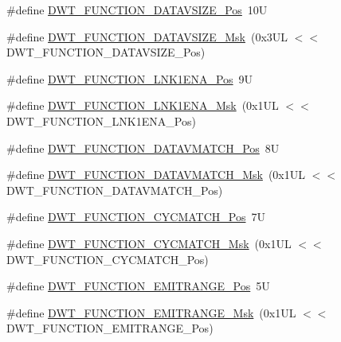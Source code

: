 \begin{DoxyCompactItemize}
\#define \hyperlink{group___c_m_s_i_s___d_w_t_ga0517a186d4d448aa6416440f40fe7a4d}{D\+W\+T\+\_\+\+F\+U\+N\+C\+T\+I\+O\+N\+\_\+\+D\+A\+T\+A\+V\+S\+I\+Z\+E\+\_\+\+Pos}~10U
\item 
\#define \hyperlink{group___c_m_s_i_s___d_w_t_gaab42cbc1e6084c44d5de70971613ea76}{D\+W\+T\+\_\+\+F\+U\+N\+C\+T\+I\+O\+N\+\_\+\+D\+A\+T\+A\+V\+S\+I\+Z\+E\+\_\+\+Msk}~(0x3\+U\+L $<$$<$ D\+W\+T\+\_\+\+F\+U\+N\+C\+T\+I\+O\+N\+\_\+\+D\+A\+T\+A\+V\+S\+I\+Z\+E\+\_\+\+Pos)
\item 
\#define \hyperlink{group___c_m_s_i_s___d_w_t_ga89d7c48858b4d4de96cdadfac91856a1}{D\+W\+T\+\_\+\+F\+U\+N\+C\+T\+I\+O\+N\+\_\+\+L\+N\+K1\+E\+N\+A\+\_\+\+Pos}~9U
\item 
\#define \hyperlink{group___c_m_s_i_s___d_w_t_ga64bd419260c3337cacf93607d1ad27ac}{D\+W\+T\+\_\+\+F\+U\+N\+C\+T\+I\+O\+N\+\_\+\+L\+N\+K1\+E\+N\+A\+\_\+\+Msk}~(0x1\+U\+L $<$$<$ D\+W\+T\+\_\+\+F\+U\+N\+C\+T\+I\+O\+N\+\_\+\+L\+N\+K1\+E\+N\+A\+\_\+\+Pos)
\item 
\#define \hyperlink{group___c_m_s_i_s___d_w_t_ga106f3672cd4be7c7c846e20497ebe5a6}{D\+W\+T\+\_\+\+F\+U\+N\+C\+T\+I\+O\+N\+\_\+\+D\+A\+T\+A\+V\+M\+A\+T\+C\+H\+\_\+\+Pos}~8U
\item 
\#define \hyperlink{group___c_m_s_i_s___d_w_t_ga32af1f1c0fcd2d8d9afd1ad79cd9970e}{D\+W\+T\+\_\+\+F\+U\+N\+C\+T\+I\+O\+N\+\_\+\+D\+A\+T\+A\+V\+M\+A\+T\+C\+H\+\_\+\+Msk}~(0x1\+U\+L $<$$<$ D\+W\+T\+\_\+\+F\+U\+N\+C\+T\+I\+O\+N\+\_\+\+D\+A\+T\+A\+V\+M\+A\+T\+C\+H\+\_\+\+Pos)
\item 
\#define \hyperlink{group___c_m_s_i_s___d_w_t_ga4b65d79ca37ae8010b4a726312413efd}{D\+W\+T\+\_\+\+F\+U\+N\+C\+T\+I\+O\+N\+\_\+\+C\+Y\+C\+M\+A\+T\+C\+H\+\_\+\+Pos}~7U
\item 
\#define \hyperlink{group___c_m_s_i_s___d_w_t_ga8e2ed09bdd33a8f7f7ce0444f5f3bb25}{D\+W\+T\+\_\+\+F\+U\+N\+C\+T\+I\+O\+N\+\_\+\+C\+Y\+C\+M\+A\+T\+C\+H\+\_\+\+Msk}~(0x1\+U\+L $<$$<$ D\+W\+T\+\_\+\+F\+U\+N\+C\+T\+I\+O\+N\+\_\+\+C\+Y\+C\+M\+A\+T\+C\+H\+\_\+\+Pos)
\item 
\#define \hyperlink{group___c_m_s_i_s___d_w_t_ga41d5b332216baa8d29561260a1b85659}{D\+W\+T\+\_\+\+F\+U\+N\+C\+T\+I\+O\+N\+\_\+\+E\+M\+I\+T\+R\+A\+N\+G\+E\+\_\+\+Pos}~5U
\item 
\#define \hyperlink{group___c_m_s_i_s___d_w_t_gad46dd5aba29f2e28d4d3f50b1d291f41}{D\+W\+T\+\_\+\+F\+U\+N\+C\+T\+I\+O\+N\+\_\+\+E\+M\+I\+T\+R\+A\+N\+G\+E\+\_\+\+Msk}~(0x1\+U\+L $<$$<$ D\+W\+T\+\_\+\+F\+U\+N\+C\+T\+I\+O\+N\+\_\+\+E\+M\+I\+T\+R\+A\+N\+G\+E\+\_\+\+Pos)
\item 
$$
\end{DoxyCompactItemize}
